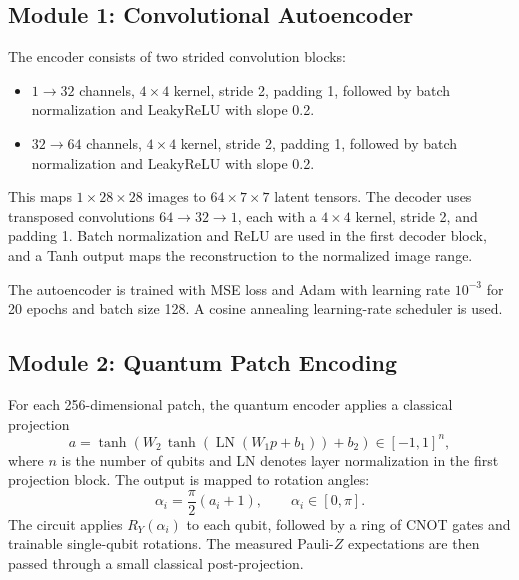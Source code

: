 \subsection{Module 1: Convolutional Autoencoder}
The encoder consists of two strided convolution blocks:
\begin{itemize}
    \item $1\rightarrow32$ channels, $4\times4$ kernel, stride 2, padding 1, followed by batch normalization and LeakyReLU with slope 0.2.
    \item $32\rightarrow64$ channels, $4\times4$ kernel, stride 2, padding 1, followed by batch normalization and LeakyReLU with slope 0.2.
\end{itemize}
This maps $1\times28\times28$ images to $64\times7\times7$ latent tensors. The decoder uses transposed convolutions $64\rightarrow32\rightarrow1$, each with a $4\times4$ kernel, stride 2, and padding 1. Batch normalization and ReLU are used in the first decoder block, and a Tanh output maps the reconstruction to the normalized image range.

The autoencoder is trained with MSE loss and Adam with learning rate $10^{-3}$ for 20 epochs and batch size 128. A cosine annealing learning-rate scheduler is used.

\subsection{Module 2: Quantum Patch Encoding}
For each 256-dimensional patch, the quantum encoder applies a classical projection
\begin{equation}
    a = \tanh\!\left(W_2\,\tanh(\operatorname{LN}(W_1p+b_1))+b_2\right)
    \in[-1,1]^n,
\end{equation}
where $n$ is the number of qubits and LN denotes layer normalization in the first projection block. The output is mapped to rotation angles:
\begin{equation}
    \alpha_i = \frac{\pi}{2}(a_i+1),\qquad \alpha_i\in[0,\pi].
\end{equation}
The circuit applies $R_Y(\alpha_i)$ to each qubit, followed by a ring of CNOT gates and trainable single-qubit rotations. The measured Pauli-$Z$ expectations are then passed through a small classical post-projection.

